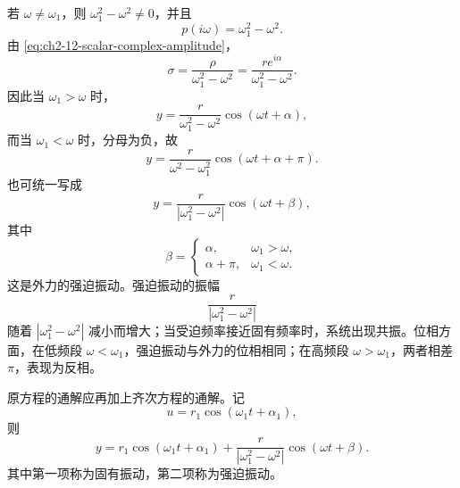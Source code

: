 若 \(\omega\ne\omega_1\)，则 \(\omega_1^2-\omega^2\ne0\)，并且
\[
 p(i\omega)=\omega_1^2-\omega^2.
\]
由 \eqref{eq:ch2-12-scalar-complex-amplitude}，
\begin{equation}
 \sigma=\frac{\rho}{\omega_1^2-\omega^2}
 =\frac{re^{i\alpha}}{\omega_1^2-\omega^2}.
 \label{eq:ch2-12-oscillator-nonresonant-amplitude}
\end{equation}
因此当 \(\omega_1>\omega\) 时，
\begin{equation}
 y=\frac{r}{\omega_1^2-\omega^2}\cos(\omega t+\alpha),
 \label{eq:ch2-12-oscillator-nonresonant-low}
\end{equation}
而当 \(\omega_1<\omega\) 时，分母为负，故
\begin{equation}
 y=\frac{r}{\omega^2-\omega_1^2}
  \cos(\omega t+\alpha+\pi).
 \label{eq:ch2-12-oscillator-nonresonant-high}
 \end{equation}
也可统一写成
\begin{equation}
 y=\frac{r}{|\omega_1^2-\omega^2|}
 \cos(\omega t+\beta),
 \label{eq:ch2-12-oscillator-forced-unified}
\end{equation}
其中
\[
 \beta=
 \begin{cases}
  \alpha,&\omega_1>\omega,\\
  \alpha+\pi,&\omega_1<\omega.
 \end{cases}
\]
这是外力的强迫振动。强迫振动的振幅
\[
 \frac{r}{|\omega_1^2-\omega^2|}
\]
随着 \(|\omega_1^2-\omega^2|\) 减小而增大；当受迫频率接近固有频率时，系统出现共振。位相方面，在低频段 \(\omega<\omega_1\)，强迫振动与外力的位相相同；在高频段 \(\omega>\omega_1\)，两者相差 \(\pi\)，表现为反相。

原方程的通解应再加上齐次方程的通解。记
\[
 u=r_1\cos(\omega_1t+\alpha_1),
\]
则
\begin{equation}
 y=r_1\cos(\omega_1t+\alpha_1)
 +\frac{r}{|\omega_1^2-\omega^2|}
  \cos(\omega t+\beta).
 \label{eq:ch2-12-oscillator-general}
\end{equation}
其中第一项称为固有振动，第二项称为强迫振动。

